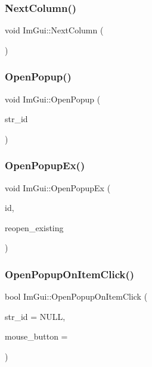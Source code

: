 \subsubsection{\texorpdfstring{Next\+Column()}{NextColumn()}}
{\footnotesize\ttfamily void Im\+Gui\+::\+Next\+Column (\begin{DoxyParamCaption}{ }\end{DoxyParamCaption})}

\hypertarget{namespace_im_gui_a9576648c40b92f54b671e2e51654dd2c}{}\label{namespace_im_gui_a9576648c40b92f54b671e2e51654dd2c} 
\subsubsection{\texorpdfstring{Open\+Popup()}{OpenPopup()}}
{\footnotesize\ttfamily void Im\+Gui\+::\+Open\+Popup (\begin{DoxyParamCaption}\item[{const char $\ast$}]{str\+\_\+id }\end{DoxyParamCaption})}

\hypertarget{namespace_im_gui_a92683a696319581577334d6b798e2f97}{}\label{namespace_im_gui_a92683a696319581577334d6b798e2f97} 
\subsubsection{\texorpdfstring{Open\+Popup\+Ex()}{OpenPopupEx()}}
{\footnotesize\ttfamily void Im\+Gui\+::\+Open\+Popup\+Ex (\begin{DoxyParamCaption}\item[{Im\+Gui\+ID}]{id,  }\item[{bool}]{reopen\+\_\+existing }\end{DoxyParamCaption})}

\hypertarget{namespace_im_gui_a546fc46d8f510cb17a2f272891e2f5b3}{}\label{namespace_im_gui_a546fc46d8f510cb17a2f272891e2f5b3} 
\subsubsection{\texorpdfstring{Open\+Popup\+On\+Item\+Click()}{OpenPopupOnItemClick()}}
{\footnotesize\ttfamily bool Im\+Gui\+::\+Open\+Popup\+On\+Item\+Click (\begin{DoxyParamCaption}\item[{const char $\ast$}]{str\+\_\+id = {\ttfamily NULL},  }\item[{int}]{mouse\+\_\+button = {} }\end{DoxyParamCaption})}

